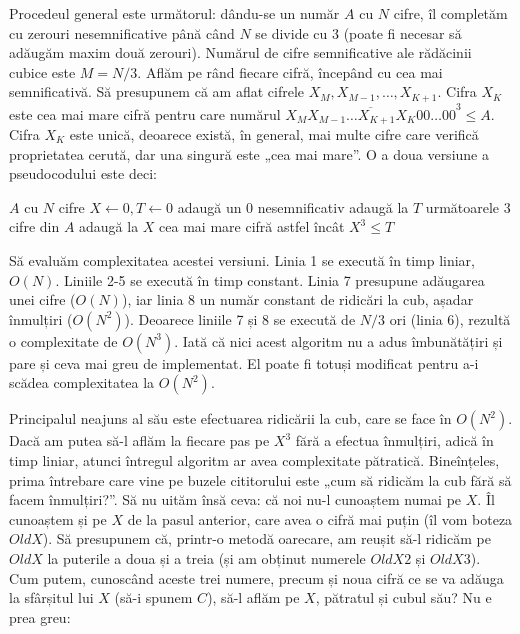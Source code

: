 Procedeul general este următorul: dându-se un număr $A$ cu $N$ cifre, îl
completăm cu zerouri nesemnificative până când $N$ se divide cu 3 (poate fi
necesar să adăugăm maxim două zerouri). Numărul de cifre semnificative ale
rădăcinii cubice este $M = N / 3$. Aflăm pe rând fiecare cifră, începând cu
cea mai semnificativă. Să presupunem că am aflat cifrele $X_{M}, X_{M-1},
\dots, X_{K+1}$. Cifra $X_K$ este cea mai mare cifră pentru care numărul
$\overline{X_{M}X_{M-1}{\dots}X_{K+1}X_{K}00{\dots}00}^3 \leq A$. Cifra $X_K$
este unică, deoarece există, în general, mai multe cifre care verifică
proprietatea cerută, dar una singură este „cea mai mare”. O a doua versiune a
pseudocodului este deci:

\vspace{\algskip}
\begin{algorithmic}[1]
 $A$ cu $N$ cifre
\STATE $X \leftarrow 0, T \leftarrow 0$
\STATE adaugă un 0 nesemnificativ
\ENDWHILE
{}
\STATE adaugă la $T$ următoarele 3 cifre din $A$
\STATE adaugă la $X$ cea mai mare cifră astfel încât $X^3 \leq T$
\ENDFOR
\end{algorithmic}

Să evaluăm complexitatea acestei versiuni. Linia 1 se execută în timp liniar,
$O(N)$. Liniile 2-5 se execută în timp constant. Linia 7 presupune adăugarea
unei cifre ($O(N)$), iar linia 8 un număr constant de ridicări la cub, așadar
înmulțiri ($O(N^2)$). Deoarece liniile 7 și 8 se execută de $N/3$ ori (linia
6), rezultă o complexitate de $O(N^3)$. Iată că nici acest algoritm nu a adus
îmbunătățiri și pare și ceva mai greu de implementat. El poate fi totuși
modificat pentru a-i scădea complexitatea la $O(N^2)$.

Principalul neajuns al său este efectuarea ridicării la cub, care se face în
$O(N^2)$. Dacă am putea să-l aflăm la fiecare pas pe $X^3$ fără a efectua
înmulțiri, adică în timp liniar, atunci întregul algoritm ar avea complexitate
pătratică. Bineînțeles, prima întrebare care vine pe buzele cititorului este
„cum să ridicăm la cub fără să facem înmulțiri?”. Să nu uităm însă ceva: că
noi nu-l cunoaștem numai pe $X$. Îl cunoaștem și pe $X$ de la pasul anterior,
care avea o cifră mai puțin (îl vom boteza $OldX$). Să presupunem că, printr-o
metodă oarecare, am reușit să-l ridicăm pe $OldX$ la puterile a doua și a
treia (și am obținut numerele $OldX2$ și $OldX3$). Cum putem, cunoscând aceste
trei numere, precum și noua cifră ce se va adăuga la sfârșitul lui $X$ (să-i
spunem $C$), să-l aflăm pe $X$, pătratul și cubul său? Nu e prea greu:

